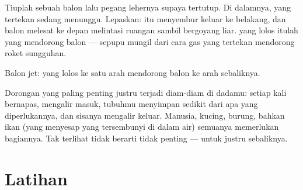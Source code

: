 \begin{example}\label{ex:g2:air-around-us:balloon}
Tiuplah sebuah balon lalu pegang lehernya supaya tertutup. Di
dalamnya,  yang tertekan sedang menunggu. Lepaskan:  itu
menyembur keluar ke belakang, dan balon melesat ke depan melintasi
ruangan sambil bergoyang liar.  yang lolos itulah yang mendorong
balon --- sepupu mungil dari cara gas yang tertekan mendorong roket
sungguhan.
\end{example}

\begin{omfigure}

{\small Balon jet:  yang lolos ke satu arah mendorong balon ke
arah sebaliknya.}
\end{omfigure}

\begin{remark}\label{rem:g2:air-around-us:breathe}
Dorongan yang paling penting justru terjadi diam-diam di dadamu:
setiap kali bernapas,  mengalir masuk, tubuhmu menyimpan sedikit
dari apa yang diperlukannya, dan sisanya mengalir keluar. Manusia,
kucing, burung, bahkan ikan (yang menyesap  yang tersembunyi di
dalam air) semuanya memerlukan bagiannya. Tak terlihat tidak berarti
tidak penting --- untuk  justru sebaliknya.
\end{remark}

\section{Latihan}

